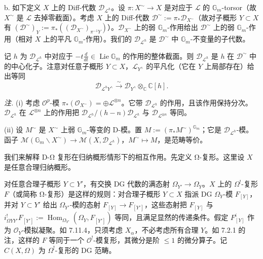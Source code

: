 b. 如下定义 $X$ 上的 Diff-代数 $\mathcal{D}_{\mathcal{L}^h}$。设 $\pi:X^\sim\to X$ 是对应于 $\mathcal{L}$ 的 $\mathbb{G}_m$-torsor（故 $X^\sim$ 是 $\mathcal{L}$ 去掉零截面）。考虑 $X$ 上的 Diff-代数 $\mathcal{D}^\sim:=\pi_*\mathcal{D}_{X^\sim}$（故对子概形 $Y\subset X$ 有 $(\mathcal{D}^\sim)_Y:=\pi_*((\mathcal{D}_{X^\sim})_{\pi^{-1}Y})$）。$\mathcal{D}_{X^\sim}$ 上的弱 $\mathbb{G}_m$-作用给出 $\mathcal{D}^\sim$ 上的弱 $\mathbb{G}_m$-作用（相对 $X$ 上的平凡 $\mathbb{G}_m$-作用）。我们的 $\mathcal{D}_{\mathcal{L}^h}$ 是 $\mathcal{D}^\sim$ 中 $\mathbb{G}_m$-不变量的子代数。

记 $h$ 为 $\mathcal{D}_{\mathcal{L}^h}$ 中对应于 $-t\frac{d}{dt}\in\operatorname{Lie}\mathbb{G}_m$ 的作用的整体截面。则 $\mathcal{D}_{\mathcal{L}^h}$ 是 $h$ 在 $\mathcal{D}^\sim$ 中的中心化子。注意对任意子概形 $Y\subset X$，$\mathcal{L}_{Y^\wedge}$ 的平凡化（它在 $Y$ 上局部存在）给出等同
\[
\mathcal{D}_{\mathcal{L}^hY^\wedge}\xrightarrow{\sim}\mathcal{D}_{Y^\wedge}\otimes_{\mathbb{C}}\mathbb{C}[h].
\]

\emph{注.} (i) 考虑 $\mathcal{O}^p$-模 $\pi_*(\mathcal{O}_{X^\sim})=\oplus\mathcal{L}^{\otimes n}$。它带 $\mathcal{D}_{\mathcal{L}^h}$ 的作用，且该作用保持分次。$\mathcal{D}_{\mathcal{L}^h}$ 在 $\mathcal{L}^{\otimes n}$ 上的作用把 $\mathcal{D}_{\mathcal{L}^h}/(h-n)\mathcal{D}_{\mathcal{L}^h}$ 与 $\mathcal{D}_{\mathcal{L}^{\otimes n}}$ 等同。


(ii) 设 $M^\sim$ 是 $X^\sim$ 上弱 $\mathbb{G}_m$-等变的 D-模。置 $M:=(\pi_*M^\sim)^{\mathbb{G}_m}$；它是 $\mathcal{D}_{\mathcal{L}^h}$-模。函子 $\mathcal{M}(\mathbb{G}_m\backslash X^\sim)\to\mathcal{M}(X,\mathcal{D}_{\mathcal{L}^h})$，$M^\sim\mapsto M$，是范畴等价。

 我们来解释 D-Ω 复形在归纳概形情形下的相互作用。先定义 Ω-复形。这里设 $X$ 是任意合理归纳概形。

对任意合理子概形 $Y\subset Y'$，有交换 DG 代数的满态射 $\Omega_{Y'}\to\Omega_Y$。$X$ 上的 $\Omega^!$-复形 $F$（或简称 Ω-复形）是这样的规则：对合理子概形 $Y\subset X$ 指派 DG $\Omega_Y$-模 $F_{[Y]}$，并对 $Y\subset Y'$ 给出 $\Omega_{Y'}$-模的态射 $F_{[Y]}\to F_{[Y']}$，这些态射把 $F_{[Y]}$ 与 $i^!_{\Omega YY'}F_{[Y']}:=\operatorname{Hom}_{\Omega_{Y'}}(\Omega_Y,F_{[Y']})$ 等同，且满足显然的传递条件。假定 $F^i_{[Y]}$ 作为 $\mathcal{O}_Y$-模拟凝聚。如 7.11.4，只须考虑 $X_\alpha$，不必考虑所有合理 $Y$。如 7.2.1 的注，这样的 $F$ 等同于一个 $\mathcal{O}^!$-模复形，其微分是阶 $\le 1$ 的微分算子。记 $C(X,\Omega)$ 为 $\Omega^!$-复形的 DG 范畴。

